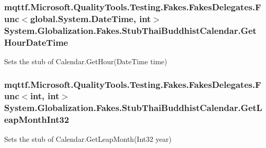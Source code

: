 \hypertarget{class_system_1_1_globalization_1_1_fakes_1_1_stub_thai_buddhist_calendar_a64b8afc35e441c9c16c31e3b0f57c4fb}{
\subsubsection[{Get\-Hour\-Date\-Time}]{\setlength{\rightskip}{0pt plus 5cm}mqttf.\-Microsoft.\-Quality\-Tools.\-Testing.\-Fakes.\-Fakes\-Delegates.\-Func$<$global.\-System.\-Date\-Time, int$>$ System.\-Globalization.\-Fakes.\-Stub\-Thai\-Buddhist\-Calendar.\-Get\-Hour\-Date\-Time}}\label{class_system_1_1_globalization_1_1_fakes_1_1_stub_thai_buddhist_calendar_a64b8afc35e441c9c16c31e3b0f57c4fb}


Sets the stub of Calendar.\-Get\-Hour(\-Date\-Time time)

\hypertarget{class_system_1_1_globalization_1_1_fakes_1_1_stub_thai_buddhist_calendar_ad7d2ad29cb1e7e72f93726193b583d28}{
\subsubsection[{Get\-Leap\-Month\-Int32}]{\setlength{\rightskip}{0pt plus 5cm}mqttf.\-Microsoft.\-Quality\-Tools.\-Testing.\-Fakes.\-Fakes\-Delegates.\-Func$<$int, int$>$ System.\-Globalization.\-Fakes.\-Stub\-Thai\-Buddhist\-Calendar.\-Get\-Leap\-Month\-Int32}}\label{class_system_1_1_globalization_1_1_fakes_1_1_stub_thai_buddhist_calendar_ad7d2ad29cb1e7e72f93726193b583d28}


Sets the stub of Calendar.\-Get\-Leap\-Month(\-Int32 year)

